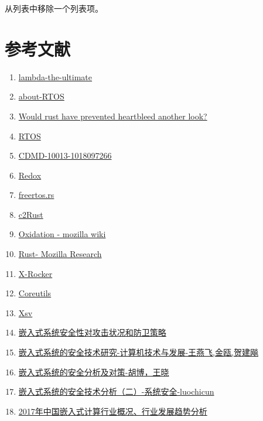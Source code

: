\documentclass[12pt, a4paper]{article}
\begin{document}
从列表中移除一个列表项。

\section{参考文献}
\begin{enumerate}
	\item \href{http://lambda-the-ultimate.org/node/4009}{lambda-the-ultimate}
	\item \href{https://www.freertos.org/about-RTOS.html}{about-RTOS}
	\item \href{https://tonyarcieri.com/would-rust-have-prevented-heartbleed-another-look}{Would rust have prevented heartbleed another look?}
	\item \href{http://www.360doc.com/content/16/0315/09/478627_542305628.shtml}{RTOS}
	\item \href{http://cdmd.cnki.com.cn/Article/CDMD-10013-1018097266.htm}{CDMD-10013-1018097266}
	\item \href{https://www.redox-os.org}{Redox}
	\item \href{https://github.com/hashmismatch/freertos.rs}{freertos.rs}
	\item \href{https://c2rust.com}{c2Rust}
	\item \href{https://wiki.mozilla.org/Oxidation}{Oxidation - mozilla wiki}
	\item \href{https://research.mozilla.org/rust/}{Rust- Mozilla Research}
	\item \href{https://github.com/OSH-2018/X-rocker}{X-Rocker}
	\item \href{https://github.com/uutils/coreutils}{Coreutils}
	\item \href{https://github.com/BurntSushi/xsv}{Xsv}
	\item \href{http://www.chinaaet.com/article/105340}{嵌入式系统安全性对攻击状况和防卫策略}
	\item \href{http://request.uml.com.cn/upfile/%E5%B5%8C%E5%85%A5%E5%BC%8F%E7%B3%BB%E7%BB%9F%E7%9A%84%E5%AE%89%E5%85%A8%E6%8A%80%E6%9C%AF%E7%A0%94%E7%A9%B6.pdf}{嵌入式系统的安全技术研究-计算机技术与发展-王燕飞,金瓯,贺建飚}
	\item \href{https://wenku.baidu.com/view/4bbb3c1114791711cc7917b5.html}{嵌入式系统的安全分析及对策-胡博，王晓}
	\item \href{https://www.4hou.com/system/12274.html}{嵌入式系统的安全技术分析（二）-系统安全-luochicun}
	\item \href{http://www.ccomsoft.com/show.asp?typeid=2&sortid=35&id=465}{2017年中国嵌入式计算行业概况、行业发展趋势分析}

\end{enumerate}
\end{document}
